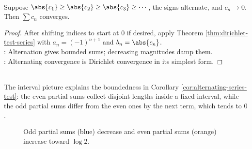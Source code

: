 \begin{corollary} \label{cor:alternating-series-test} \\
Suppose $\abs{c_1}\geq\abs{c_2}\geq\abs{c_3}\geq\cdots$, the signs alternate, and $c_n\to0$. Then $\sum c_n$ converges.
\begin{proof}
After shifting indices to start at $0$ if desired, apply Theorem \ref{thm:dirichlet-test-series} with $a_n=(-1)^{n+1}$ and $b_n=\abs{c_n}$.\\
: Alternation gives bounded sums; decreasing magnitudes damp them.\\
: Alternating convergence is Dirichlet convergence in its simplest form.
\end{proof}
\end{corollary}

\begin{perspective} \label{per:alternating-series-interval-picture} \\
The interval picture explains the boundedness in Corollary \ref{cor:alternating-series-test}: the even partial sums collect disjoint lengths inside a fixed interval, while the odd partial sums differ from the even ones by the next term, which tends to $0$.
\end{perspective}

\begin{figure}[H]
  \centering
  
  \caption{Odd partial sums (blue) decrease and even partial sums (orange) increase toward $\log2$.}
  \label{fig:alternating-harmonic-partial-sums}
\end{figure}
